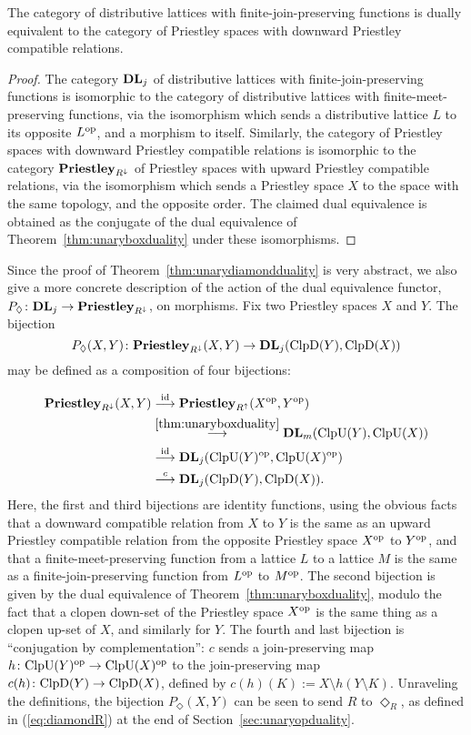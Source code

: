 \begin{theorem}\label{thm:unarydiamondduality}
  The category of distributive lattices with finite-join-preserving functions is dually equivalent to the category of Priestley spaces with downward Priestley compatible relations.
  \end{theorem}
\begin{proof}
The category $\mathbf{DL}_j$ of distributive lattices with finite-join-preserving functions is isomorphic to the category of distributive lattices with finite-meet-preserving functions, via the isomorphism which sends a distributive lattice $L$ to its opposite $L^{\mathrm{op}}$, and a morphism to itself. Similarly, the category of Priestley spaces with downward Priestley compatible relations is isomorphic to the category $\mathbf{Priestley}_{R^{\downarrow}}$ of Priestley spaces with upward Priestley compatible relations, via the isomorphism which sends a Priestley space $X$ to the space with the same topology, and the opposite order. The claimed dual equivalence is obtained as the conjugate of the dual equivalence of Theorem~\ref{thm:unaryboxduality} under these isomorphisms.
\end{proof}
Since the proof of Theorem~\ref{thm:unarydiamondduality} is very abstract, we also give a more concrete description of the action of the dual equivalence functor, $P_\Diamond \colon \mathbf{DL}_j \to \mathbf{Priestley}_{R^{\downarrow}}$, on morphisms. Fix two Priestley spaces $X$ and $Y$. The bijection $$P_\Diamond(X,Y) \colon \mathbf{Priestley}_{R^{\downarrow}}(X,Y) \to \mathbf{DL}_j(\mathrm{ClpD}(Y),\mathrm{ClpD}(X))$$ may be defined as a composition of four bijections: 

\begin{align} \label{eq:bijection-chain}
	\mathbf{Priestley}_{R^{\downarrow}}(X,Y) &\stackrel{\mathrm{id}}{\longrightarrow} \mathbf{Priestley}_{R^{\uparrow}}(X^{\mathrm{op}},Y^{\mathrm{op}}) \\
	&\stackrel{\ref{thm:unaryboxduality}}{\longrightarrow} \mathbf{DL}_m(\mathrm{ClpU}(Y), \mathrm{ClpU}(X)) \nonumber \\
	&\stackrel{\mathrm{id}}{\longrightarrow} \mathbf{DL}_j(\mathrm{ClpU}(Y)^{\mathrm{op}}, \mathrm{ClpU}(X)^{\mathrm{op}}) \nonumber \\
	&\stackrel{c}{\longrightarrow} \mathbf{DL}_j(\mathrm{ClpD}(Y),\mathrm{ClpD}(X)). \nonumber
\end{align}
Here, the first and third bijections are identity functions, using the obvious facts that a downward compatible relation from $X$ to $Y$ is the same as an upward Priestley compatible relation from the opposite Priestley space $X^{\mathrm{op}}$ to $Y^{\mathrm{op}}$, and that a finite-meet-preserving function from a lattice $L$ to a lattice $M$ is the same as a finite-join-preserving function from $L^{\mathrm{op}}$ to $M^{\mathrm{op}}$. The second bijection is given by the dual equivalence of Theorem~\ref{thm:unaryboxduality}, modulo the fact that a clopen down-set of the Priestley space $X^{\mathrm{op}}$ is the same thing as a clopen up-set of $X$, and similarly for $Y$. The fourth and last bijection is ``conjugation by complementation'': $c$ sends a join-preserving map $h \colon \mathrm{ClpU}(Y)^{\mathrm{op}} \to \mathrm{ClpU}(X)^{\mathrm{op}}$ to the join-preserving map $c(h) \colon \mathrm{ClpD}(Y) \to \mathrm{ClpD}(X)$, defined by $c(h)(K) := X \setminus h(Y \setminus K)$. Unraveling the definitions, the bijection $P_{\Diamond}(X,Y)$ can be seen to send $R$ to $\Diamond_R$, as defined in (\ref{eq:diamondR}) at the end of Section~\ref{sec:unaryopduality}.


